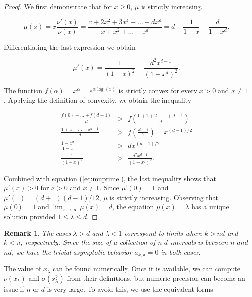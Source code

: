 \documentclass{article}
\newtheorem*{remark}{Remark}
\begin{document}
\begin{proof}
We first demonstrate that for $x \geq 0$, $\mu$ is strictly increasing.

\begin{equation}
\label{eq:mu}
\mu(x) = x\frac{\nu'(x)}{\nu(x)} =
\frac{x+2x^2+3x^3+\ldots+dx^d}{x+x^2+\ldots+x^d} =
d+\frac{1}{1-x} - \frac{d}{1-x^d}.
\end{equation} 

Differentiating the last expression we obtain

\begin{equation}
\label{eq:muprime}
\mu'(x) = \frac{1}{(1-x)^2} -\frac{d^2x^{d-1}}{(1-x^d)^2}.
\end{equation}

The function $f(\alpha) = x^{\alpha} = e^{\alpha \log(x)}$ is strictly
convex for every $x > 0$ and $x \neq 1$. Applying the definition of
convexity, we obtain the inequality

\begin{eqnarray*}
\frac{f(0)+\ldots+f(d-1)}{d} &>&
f\left(\frac{0+1+2+\ldots+d-1}{d}\right) \\
\frac{1+x+\ldots+x^{d-1}}{d} &>& f\left(\frac{d-1}{2}\right)
= x^{(d-1)/2} \\
\frac{1-x^d}{1-x} &>& dx^{(d-1)/2} \\
\frac{1}{(1-x)^2} &>& \frac{d^2x^{d-1}}{(1-x^d)^2}.
\end{eqnarray*}

Combined with equation (\ref{eq:muprime}), the last inequality shows that
$\mu'(x) > 0$ for $x > 0$ and $x \neq 1$. Since $\mu'(0) = 1$ and $\mu'(1)
= (d+1)(d-1)/12$, $\mu$ is strictly increasing. Observing that $\mu(0) =
1$ and $\lim_{x\rightarrow\infty} \mu(x) = d$, the equation $\mu(x) =
\lambda$ has a unique solution provided $1 \leq \lambda \leq d$.
\end{proof}

\begin{remark}
The cases $\lambda > d$ and $\lambda < 1$ correspond to limits where $k >
nd$ and $k < n$, respectively. Since the size of a collection of $n$
$d$-intervals is between $n$ and $nd$, we have the trivial asymptotic
behavior $a_{k,n} = 0$ in both cases.
\end{remark}


The value of $x_\lambda$ can be found numerically. Once it is available,
we can compute $\nu(x_\lambda)$ and $\sigma(x_\lambda^2)$ from their
definitions, but numeric precision can become an issue if $n$ or $d$ is
very large. To avoid this, we use the equivalent forms
\end{document}
